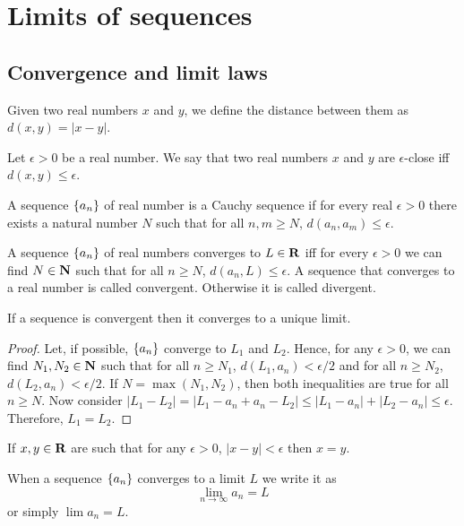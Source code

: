 \chapter{Limits of sequences}\label{c5}
\section{Convergence and limit laws}\label{c5s1}
\begin{defn}\label{c5s1d1}
Given two real numbers $x$ and $y$, we define the distance between them as
$d(x, y) = |x - y|$.
\end{defn}
\begin{defn}\label{c5s1d2}
Let $\epsilon > 0$ be a real number. We say that two real numbers $x$ and 
$y$ are $\epsilon$-close iff $d(x, y) \le \epsilon$.
\end{defn}
\begin{defn}\label{c5s1d3}
A sequence $\{a_n\}$ of real number is a Cauchy sequence if for every
real $\epsilon > 0$ there exists a natural number $N$ such that for all
$n, m \ge N$, $d(a_n, a_m) \le \epsilon$.
\end{defn}
\begin{defn}\label{c5s1d4}
A sequence $\{a_n\}$ of real numbers converges to $L \in \mathbf{R}$ iff for
every $\epsilon > 0$ we can find $N \in \mathbf{N}$ such that for all $n \ge N$,
$d(a_n, L) \le \epsilon$. A sequence that converges to a real number is 
called convergent. Otherwise it is called divergent.
\end{defn}

\begin{prop}\label{c5s1p1}
If a sequence is convergent then it converges to a unique limit.
\end{prop}
\begin{proof}
Let, if possible, $\{a_n\}$ converge to $L_1$ and $L_2$. Hence, for any 
$\epsilon > 0$, we can find $N_1, N_2 \in \mathbf{N}$ such that for all $n \ge 
N_1$, $d(L_1, a_n) < \epsilon/2$ and for all $n \ge N_2$, $d(L_2, a_n) <
\epsilon/2$. If $N = \max(N_1, N_2)$, then both inequalities are true for
all $n \ge N$. Now consider $|L_1 - L_2| = |L_1 - a_n + a_n - L_2| \le
|L_1 - a_n| + |L_2 - a_n| \le \epsilon$. Therefore, $L_1 = L_2$.
\end{proof}
\begin{rem}
If $x, y \in \mathbf{R}$ are such that for any $\epsilon > 0$, $|x - y| < \epsilon$
then $x = y$.
\end{rem}

When a sequence $\{a_n\}$ converges to a limit $L$ we write it as
\[
\lim_{n \rightarrow \infty} a_n = L
\]
or simply $\lim a_n = L$.

